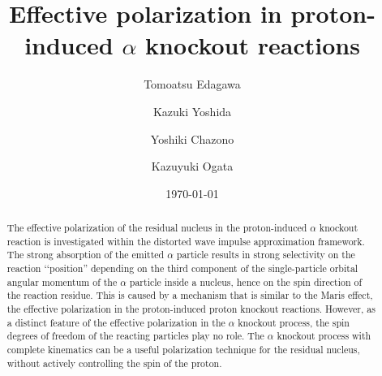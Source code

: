 \documentclass[%
 reprint,
superscriptaddress,
 amsmath,amssymb,
 aps,
]{revtex4-2}
\begin{document}

\title{Effective polarization in proton-induced $\alpha$ knockout reactions}%

\author{Tomoatsu Edagawa}
%


 \author{Kazuki Yoshida}


\author{Yoshiki Chazono}
%


\author{Kazuyuki Ogata}
%


\date{\today}%

\begin{abstract}
  The effective polarization of the residual nucleus in 
  the proton-induced $\alpha$ knockout reaction is investigated 
  within the distorted wave impulse approximation framework. 
  The strong absorption of the emitted $\alpha$ particle results in strong selectivity 
  on the reaction {\lq\lq}position'' depending on 
  the third component of the single-particle orbital angular momentum 
  of the $\alpha$ particle inside a nucleus, 
  hence on the spin direction of the reaction residue. 
  This is caused by a mechanism that is similar to the Maris effect, 
  the effective polarization in the proton-induced proton knockout reactions. 
  However, as a distinct feature of the effective polarization in 
  the $\alpha$ knockout process, the spin degrees of freedom of 
  the reacting particles play no role. 
  The $\alpha$ knockout process with complete kinematics can be 
  a useful polarization technique for the residual nucleus, 
  without actively controlling the spin of the proton.
\end{abstract}
\end{document}

